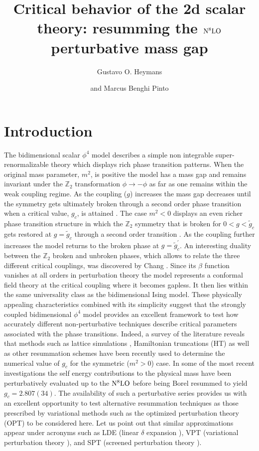 \documentclass[a4paper,11pt]{article}
\title{\boldmath Critical behavior of the 2d scalar theory: resumming the ${\rm N}^8{\rm LO}$ perturbative mass gap}
\author{Gustavo O. Heymans}
\author{and Marcus Benghi Pinto}
\affiliation{Departamento de F\'{\i}sica, Universidade Federal de Santa
  Catarina, 88040-900 Florian\'{o}polis, SC, Brazil}
\begin{document}
 
\maketitle
\flushbottom
\section{Introduction} 

The bidimensional scalar $\phi^4$ model describes a simple non integrable super-renormalizable theory which displays  rich phase transition patterns. When the original mass parameter, $m^2$, is positive the model has a mass gap and remains  invariant under the   $\mathbb{Z}_2$ transformation $\phi \to -\phi$  as far as one remains within the weak coupling regime. As the coupling ($g$) increases the mass gap decreases until the symmetry gets ultimately broken through a second order phase transition when a critical value, $g_c$, is attained \cite{chang,simon}. The case $m^2 <0$ displays an even richer phase transition structure in which the $\mathbb{Z}_2$ symmetry that is broken for $0 < g < {\tilde g}_c$ gets restored at $g= {\tilde g}_c$ through a second order transition \cite{serone2}. As the coupling further increases the model returns to the broken phase at $g =  {\tilde g}^\prime_c$. An interesting  duality between the   $\mathbb{Z}_2$ broken and unbroken phases, which allows to relate the three different critical couplings,  was discovered by Chang \cite{chang}.   Since its $\beta$ function vanishes at all orders in perturbation theory the model  represents a conformal field theory  at the critical coupling where  it becomes gapless. It then lies within the same universality class as the bidimensional Ising model.  These physically appealing characteristics  combined with its simplicity suggest that the strongly coupled bidimensional $ \phi^4$ model provides an excellent framework to test how accurately different non-perturbative techniques describe critical parameters associated with the phase transitions.  Indeed, a survey of the literature reveals that methods such as lattice simulations \cite{lattice1, lattice2, lattice3, lattice4},  Hamiltonian truncations (HT) \cite{hamilton1, hamilton2, hamilton3,hamilton4, hamilton5, hamilton6, hamilton7, hamilton8, hamilton9, hamilton10} as well as other resummation schemes \cite {paul} have  been recently used  to  determine the numerical value of $g_c$ for the symmetric ($m^2 > 0$) case. In some of the most recent investigations \cite {serone1,serone3} the self energy contributions to the physical mass have been perturbatively evaluated up to the ${\rm N}^8{\rm LO}$ before being Borel resummed to yield $g_c = 2.807(34)$. The availability of such a perturbative series provides us with an excellent opportunity to test  alternative resummation techniques as those prescribed by variational methods such as the optimized perturbation theory (OPT) \cite {opt_phi4, opt_qcd} to be considered here. Let us point out that similar 
approximations appear under  acronyms such as LDE (linear $\delta$ expansion \cite{lde}), VPT
(variational perturbation theory \cite {vpt}), and SPT (screened perturbation theory \cite{spt}).
\end{document}
